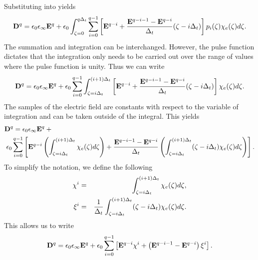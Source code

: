 Substituting  into 
yields
\begin{equation}
  \mathbf{D}^q = \epsilon_0\epsilon_\infty\mathbf{E}^q + 
    \epsilon_0\int_{\zeta=0}^{q\Delta_t}\sum_{i=0}^{q-1}
    \left[\mathbf{E}^{q-i} +
          \frac{\mathbf{E}^{q-i-1}-\mathbf{E}^{q-i}}{\Delta_t}(\zeta-i\Delta_t)\right]
     p_i(\zeta)
    \chi_e(\zeta)d\zeta.
\end{equation}
The summation and integration can be interchanged.  However, the
pulse function dictates that the integration only needs to be carried
out over the range of values where the pulse function is unity.  Thus
we can write
\begin{equation}
  \mathbf{D}^q = \epsilon_0\epsilon_\infty\mathbf{E}^q + 
    \epsilon_0\sum_{i=0}^{q-1}\int_{\zeta=i\Delta_t}^{(i+1)\Delta_t}\left[
    \mathbf{E}^{q-i} +
          \frac{\mathbf{E}^{q-i-1}-\mathbf{E}^{q-i}}{\Delta_t}(\zeta-i\Delta_t)\right]
    \chi_e(\zeta)d\zeta.
\end{equation}
The samples of the electric field are constants with respect to the
variable of integration and can be taken outside of the integral.
This yields
\begin{eqnarray}
  \lefteqn{\Dvec^q = \epsilon_0\epsilon_\infty\Evec^q +\mbox{}}  \nonumber \\
  &&
    \mbox{}\hspace{-.1in}\epsilon_0\sum_{i=0}^{q-1}\left[
    \Evec^{q-i} 
    \left(\int_{\zeta=i\Delt}^{(i+1)\Delt}\chi_e(\zeta)d\zeta\right)
    + \frac{\Evec^{q-i-1}-\Evec^{q-i}}{\Delt}
      \left(\int_{\zeta=i\Delt}^{(i+1)\Delt}(\zeta-i\Delt)\chi_e(\zeta)d\zeta\right)\right].
\end{eqnarray}
To simplify the notation, we define the following
\begin{eqnarray}
  \chi^i &=& \int_{\zeta=i\Delta_t}^{(i+1)\Delta_t}\chi_e(\zeta)d\zeta,
  \label{eq:ChiIDef}
 \\
  \xi^i &=&
     \frac{1}{\Delta_t}
     \int_{\zeta=i\Delta_t}^{(i+1)\Delta_t}(\zeta-i\Delta_t)\chi_e(\zeta)d\zeta.
  \label{eq:XiIDef}
\end{eqnarray}
This allows us to write
\begin{equation}
  \mathbf{D}^q = \epsilon_0\epsilon_\infty\mathbf{E}^q + 
    \epsilon_0\sum_{i=0}^{q-1}\left[
    \mathbf{E}^{q-i} \chi^i
    + \left(\mathbf{E}^{q-i-1}-\mathbf{E}^{q-i}\right)\xi^i\right].
  \label{eq:plrcDq}
\end{equation}


